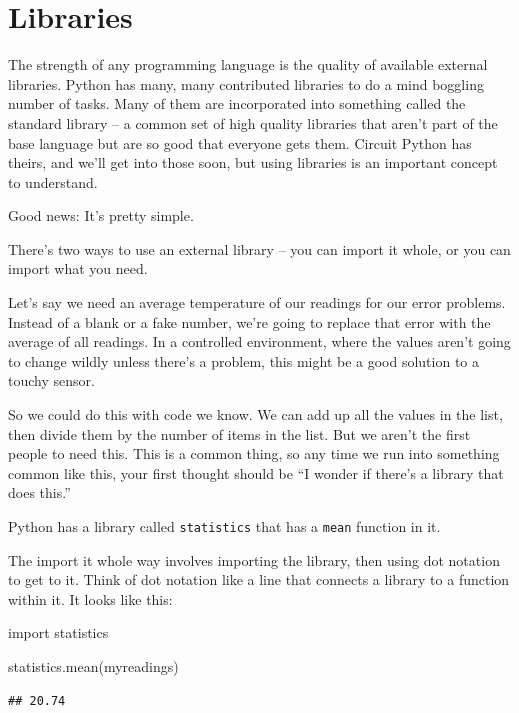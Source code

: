 \documentclass[
]{book}
\newenvironment{Shaded}{\begin{snugshade}}{\end{snugshade}}
\newcommand{\ImportTok}[1]{#1}
\newcommand{\NormalTok}[1]{#1}
\begin{document}
\hypertarget{libraries}{%
\section{Libraries}\label{libraries}}

The strength of any programming language is the quality of available external libraries. Python has many, many contributed libraries to do a mind boggling number of tasks. Many of them are incorporated into something called the standard library -- a common set of high quality libraries that aren't part of the base language but are so good that everyone gets them. Circuit Python has theirs, and we'll get into those soon, but using libraries is an important concept to understand.

Good news: It's pretty simple.

There's two ways to use an external library -- you can import it whole, or you can import what you need.

Let's say we need an average temperature of our readings for our error problems. Instead of a blank or a fake number, we're going to replace that error with the average of all readings. In a controlled environment, where the values aren't going to change wildly unless there's a problem, this might be a good solution to a touchy sensor.

So we could do this with code we know. We can add up all the values in the list, then divide them by the number of items in the list. But we aren't the first people to need this. This is a common thing, so any time we run into something common like this, your first thought should be ``I wonder if there's a library that does this.''

Python has a library called \texttt{statistics} that has a \texttt{mean} function in it.

The import it whole way involves importing the library, then using dot notation to get to it. Think of dot notation like a line that connects a library to a function within it. It looks like this:

\begin{Shaded}
\begin{Highlighting}[]
\ImportTok{import}\NormalTok{ statistics}

\NormalTok{statistics.mean(myreadings)}
\end{Highlighting}
\end{Shaded}

\begin{verbatim}
## 20.74
\end{verbatim}
\end{document}
